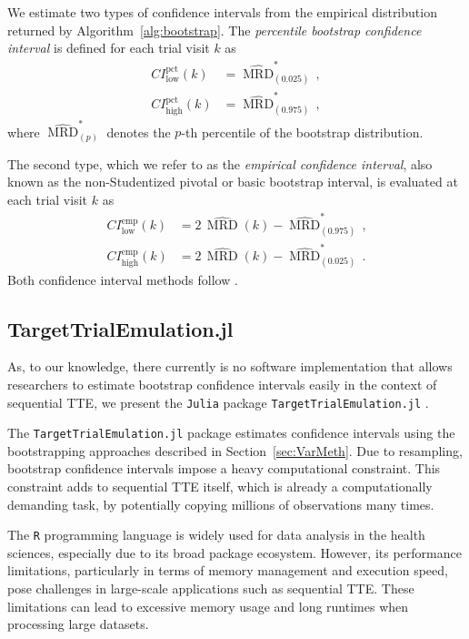 \documentclass[pdflatex,sn-vancouver-ay]{sn-jnl}%
\theoremstyle{thmstyleone}%
\theoremstyle{thmstyletwo}%
\theoremstyle{thmstylethree}%
\newcommand{\Rlang}{\texttt{R}}
\newcommand{\julia}{\texttt{Julia}}
\newcommand{\juliaTTE}{\texttt{TargetTrialEmulation.jl}}
\begin{document}
We estimate two types of confidence intervals from the empirical distribution returned by Algorithm~\ref{alg:bootstrap}. The \emph{percentile bootstrap confidence interval} is defined for each trial visit $k$ as
\begin{align}
    \label{eq:CI_percentile_1}
    CI^{\text{pct}}_{\text{low}}(k) &= \widehat{\operatorname{MRD}}^{*}_{(0.025)} \,, \\
    CI^{\text{pct}}_{\text{high}}(k) &= \widehat{\operatorname{MRD}}^{*}_{(0.975)} \,, 
    \label{eq:CI_percentile_2}
\end{align}
where $\widehat{\operatorname{MRD}}^{*}_{(p)}$ denotes the $p$-th percentile of the bootstrap distribution.

The second type, which we refer to as the \emph{empirical confidence interval}, also known as the non-Studentized pivotal or basic bootstrap interval, is evaluated at each trial visit $k$ as
\begin{align}
    \label{eq:CI_empirical_1}
    CI^{\text{emp}}_{\text{low}}(k) &= 2\, \widehat{\operatorname{MRD}}(k) - \widehat{\operatorname{MRD}}^{*}_{(0.975)} \, \text{,} \\
    CI^{\text{emp}}_{\text{high}}(k) &= 2\, \widehat{\operatorname{MRD}}(k) - \widehat{\operatorname{MRD}}^{*}_{(0.025)} \, \text{.}
    \label{eq:CI_empirical_2}
\end{align}
Both confidence interval methods follow \citet{carpenterBootstrapConfidenceIntervals2000a}.



\subsection{TargetTrialEmulation.jl}\label{sec:juliaTTE}
As, to our knowledge, there currently is no software implementation that allows researchers to estimate bootstrap confidence intervals easily in the context of sequential TTE, we present the \julia{} package \juliaTTE{} \citep{Metwaly_TargetTrialEmulation_jl_-_pre-release_2025}. 

The \juliaTTE{} package estimates confidence intervals using the bootstrapping approaches described in Section~\ref{sec:VarMeth}. Due to resampling, bootstrap confidence intervals impose a heavy computational constraint. This constraint adds to sequential TTE itself, which is already a computationally demanding task, by potentially copying millions of observations many times.

The \Rlang{} programming language is widely used for data analysis in the health sciences, especially due to its broad package ecosystem. However, its performance limitations, particularly in terms of memory management and execution speed, pose challenges in large-scale applications such as sequential TTE. These limitations can lead to excessive memory usage and long runtimes when processing large datasets.
\end{document}
